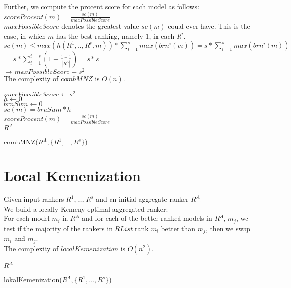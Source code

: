 \documentclass{article}
\begin{document}
		Further, we compute the procent score for each model as follows:\\
		$scoreProcent(m) = \frac{sc(m)}{maxPossibleScore}$\\
		$maxPossibleScore$ denotes the greatest value $sc(m)$ could ever have. This is the case, in which $m$ has the best ranking, namely $1$, in each $R^i$.\\
		$sc(m) \leq max(h({R^1, .., R^s}, m)) * \sum_{i = 1}^s max(brn^i(m)) = s * \sum_{i = 1}^s max(brn^i(m))$
	    $ = s * \sum_{i = 1}^{i = s} (1 - \frac{1 - 1}{|R^A|}) = s * s$ \\
	    $ \Rightarrow maxPossibleScore = s ^ 2$  \\
	    The complexity of $combMNZ$ is $O(n)$.\\
	          
         
        \begin{algorithm}[H]
	    $maxPossibleScore \leftarrow s^2$\\
	   	
	   	 {
	   		$h \leftarrow 0$\\
	   		$brnSum \leftarrow 0$\\
	   		 {
	   		}
	   		$sc(m) = brnSum * h$\\
	   		$scoreProcent(m) = \frac {sc(m)}{maxPossibleScore}$\\
	    }
	    \Return $R^A$
	    \caption{combMNZ($R^A, \{R^1,...,R^s\}$)}
	   \end{algorithm}
	   
         
    \section{Local Kemenization \cite{LK}}
      	Given input rankers $R^1,...,R^s$ and an initial aggregate ranker $R^A$.\\
        We build a locally Kemeny optimal aggregated ranker:\\ 
        For each model $m_i$ in $R^A$ and for each of the better-ranked models in $R^A$, $m_j$, we test if the majority of the rankers in $RList$ rank $m_i$ better than $m_j$, then we swap $m_i$ and $m_j$.\\
        The complexity of $localKemenization$ is $O(n^2)$.
        
        \begin{algorithm}[H]
	   	  {
	    }
	    \Return $R^A$
	    \caption{lokalKemenization($R^A, \{R^1,...,R^s\}$)}
	   \end{algorithm}
      
\end{document}
